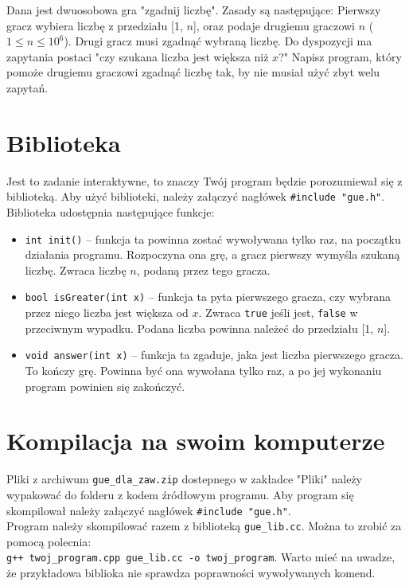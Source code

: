 \documentclass{spiral}
\begin{document}
  \makeheader

  Dana jest dwuosobowa gra "zgadnij liczbę". Zasady są następujące:
  Pierwszy gracz wybiera liczbę z przedziału [1, $n$],
  oraz podaje drugiemu graczowi $n$ ($1 \leq n \leq 10^6$).
  Drugi gracz musi zgadnąć wybraną liczbę. 
  Do dyspozycji ma zapytania postaci "czy szukana liczba jest większa niż $x$?"
  Napisz program, który pomoże drugiemu graczowi zgadnąć liczbę tak,
  by nie musiał użyć zbyt welu zapytań.

  \section{Biblioteka}
    Jest to zadanie interaktywne,
    to znaczy Twój program będzie porozumiewał się z biblioteką.
    Aby użyć biblioteki, należy załączyć nagłówek \texttt{\#include "{}gue.h"{}}.
    Biblioteka udostępnia następujące funkcje:
    \begin{itemize}
        \item \texttt{int init()} -- funkcja ta powinna zostać wywoływana
        tylko raz, na początku działania programu.
        Rozpoczyna ona grę, a gracz pierwszy wymyśla szukaną liczbę.
        Zwraca liczbę $n$, podaną przez tego gracza.

        \item \texttt{bool isGreater(int x)} -- funkcja ta pyta pierwszego gracza,
        czy wybrana przez niego liczba jest większa od $x$.
        Zwraca \texttt{true} jeśli jest, \texttt{false} w przeciwnym wypadku.
        Podana liczba powinna należeć do przedziału [1, $n$].

        \item \texttt{void answer(int x)} -- funkcja ta zgaduje,
        jaka jest liczba pierwszego gracza. To kończy grę.
        Powinna być ona wywołana tylko raz,
        a po jej wykonaniu program powinien się zakończyć.
    \end{itemize}

  \section{Kompilacja na swoim komputerze}
    Pliki z archiwum \texttt{gue\_dla\_zaw.zip} dostepnego w zakładce "Pliki"
    należy wypakować do folderu z kodem źródłowym programu.
    Aby program się skompilował należy załączyć nagłówek
    \texttt{\#include "gue.h"}.\\
    Program należy skompilować razem z biblioteką \texttt{gue\_lib.cc}.
    Można to zrobić za pomocą polecnia: \\
    \texttt{g++~twoj\_program.cpp~gue\_lib.cc~-o~twoj\_program}.
    Warto mieć na uwadze, że przykładowa biblioka nie sprawdza
    poprawności wywoływanych komend.
\end{document}
